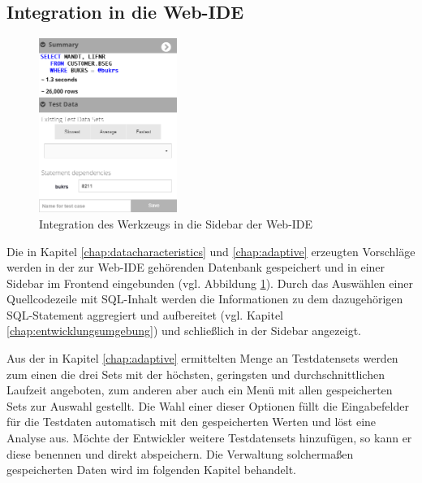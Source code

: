 \subsection{Integration in die Web-IDE}
\begin{figure}[ht]
	\centering
  \includegraphics[width=0.4\textwidth]{figures/integration.png}
	\caption{Integration des Werkzeugs in die Sidebar der Web-IDE}
	\label{fig:ideintegration}
\end{figure}

Die in Kapitel \ref{chap:datacharacteristics} und \ref{chap:adaptive} erzeugten Vorschläge werden in der zur Web-IDE gehörenden Datenbank gespeichert und in einer Sidebar im Frontend eingebunden (vgl. Abbildung \ref{fig:ideintegration}).
Durch das Auswählen einer Quellcodezeile mit SQL-Inhalt werden die Informationen zu dem dazugehörigen SQL-Statement aggregiert und aufbereitet (vgl. Kapitel \ref{chap:entwicklungsumgebung}) und schließlich in der Sidebar angezeigt.

Aus der in Kapitel \ref{chap:adaptive} ermittelten Menge an Testdatensets werden zum einen die drei Sets mit der höchsten, geringsten und durchschnittlichen Laufzeit angeboten, zum anderen aber auch ein Menü mit allen gespeicherten Sets zur Auswahl gestellt.
Die Wahl einer dieser Optionen füllt die Eingabefelder für die Testdaten automatisch mit den gespeicherten Werten und löst eine Analyse aus.
Möchte der Entwickler weitere Testdatensets hinzufügen, so kann er diese benennen und direkt abspeichern.
Die Verwaltung solchermaßen gespeicherten Daten wird im folgenden Kapitel behandelt.
